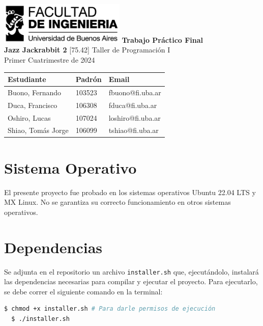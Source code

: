 \documentclass[titlepage,a4paper]{article}
\begin{document}
\begin{titlepage} %
	\hfill\includegraphics[width=6cm]{logofiuba.jpg}
    \centering
    \vfill
    \Huge \textbf{Trabajo Práctico Final\\Jazz Jackrabbit 2}
    \vskip2cm
    \Large [75.42] Taller de Programación I\\
    Primer Cuatrimestre de 2024
    \vfill
    \begin{tabular}{ | l | l | l | } %
      \hline
      \textbf{Estudiante} & \textbf{Padrón} & \textbf{Email} \\ \hline
      Buono, Fernando & 103523 & fbuono@fi.uba.ar \\ \hline
      Duca, Francisco & 106308 & fduca@fi.uba.ar \\ \hline
      Oshiro, Lucas & 107024 & loshiro@fi.uba.ar \\ \hline
      Shiao, Tomás Jorge & 106099 & tshiao@fi.uba.ar \\ \hline
  	\end{tabular}
    \vfill
    \vfill
\end{titlepage}

\clearpage\pagestyle{empty}
\tableofcontents %
\newpage
\setcounter{page}{1}
\pagestyle{fancy}
\setcounter{secnumdepth}{5}
\setcounter{tocdepth}{5}
\section{Sistema Operativo}
El presente proyecto fue probado en los sistemas operativos Ubuntu 22.04 LTS y MX Linux. No se garantiza su correcto funcionamiento en otros sistemas operativos.

\section{Dependencias}
Se adjunta en el repositorio un archivo \texttt{installer.sh} que, ejecutándolo, instalará las dependencias necesarias para compilar y ejecutar el proyecto. Para ejecutarlo, se debe correr el siguiente comando en la terminal:

\begin{lstlisting}[language=sh,caption=Ejecución del Instalador, captionpos=b]
  $ chmod +x installer.sh # Para darle permisos de ejecución
  $ ./installer.sh
\end{lstlisting}
\end{document}
